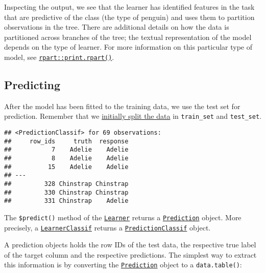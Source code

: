 \documentclass[
]{scrbook}
\newenvironment{Shaded}{\begin{snugshade}}{\end{snugshade}}
\newcommand{\AttributeTok}[1]{\textcolor[rgb]{0.77,0.63,0.00}{#1}}
\newcommand{\FunctionTok}[1]{\textcolor[rgb]{0.00,0.00,0.00}{#1}}
\newcommand{\NormalTok}[1]{#1}
\newcommand{\OtherTok}[1]{\textcolor[rgb]{0.56,0.35,0.01}{#1}}
\newcommand{\SpecialCharTok}[1]{\textcolor[rgb]{0.00,0.00,0.00}{#1}}
\renewenvironment{Shaded} {\begin{snugshade}\small} {\end{snugshade}}
\begin{document}
Inspecting the output, we see that the learner has identified features in the task that are predictive of the class (the type of penguin) and uses them to partition observations in the tree.
There are additional details on how the data is partitioned across branches of the tree; the textual representation of the model depends on the type of learner.
For more information on this particular type of model, see \href{https://www.rdocumentation.org/packages/rpart/topics/print.rpart}{\texttt{rpart::print.rpart()}}.

\hypertarget{predicting}{%
\subsection{Predicting}\label{predicting}}

After the model has been fitted to the training data, we use the test set for prediction.
Remember that we \protect\hyperlink{split-data}{initially split the data} in \texttt{train\_set} and \texttt{test\_set}.

\begin{Shaded}
\end{Shaded}

\begin{verbatim}
## <PredictionClassif> for 69 observations:
##     row_ids     truth  response
##           7    Adelie    Adelie
##           8    Adelie    Adelie
##          15    Adelie    Adelie
## ---                            
##         328 Chinstrap Chinstrap
##         330 Chinstrap Chinstrap
##         331 Chinstrap    Adelie
\end{verbatim}

The \texttt{\$predict()} method of the \href{https://mlr3.mlr-org.com/reference/Learner.html}{\texttt{Learner}} returns a \href{https://mlr3.mlr-org.com/reference/Prediction.html}{\texttt{Prediction}} object.
More precisely, a \href{https://mlr3.mlr-org.com/reference/LearnerClassif.html}{\texttt{LearnerClassif}} returns a \href{https://mlr3.mlr-org.com/reference/PredictionClassif.html}{\texttt{PredictionClassif}} object.

A prediction objects holds the row IDs of the test data, the respective true label of the target column and the respective predictions.
The simplest way to extract this information is by converting the \href{https://mlr3.mlr-org.com/reference/Prediction.html}{\texttt{Prediction}} object to a \texttt{data.table()}:
\end{document}
